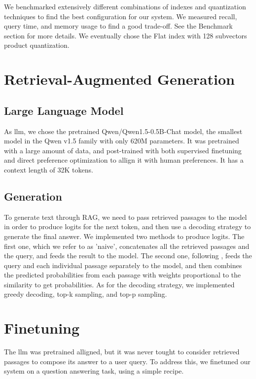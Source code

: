 \documentclass[11pt]{article}
\begin{document}
We benchmarked extensively different combinations of indexes and quantization techniques to find the best configuration
for our system. We measured recall, query time, and memory usage to find a good trade-off. See the Benchmark section for more details.
We eventually chose the Flat index with 128 subvectors product quantization.

\section{Retrieval-Augmented Generation}

\subsection{Large Language Model}

As llm, we chose the pretrained Qwen/Qwen1.5-0.5B-Chat \cite{qwen_hf} model, the smallest model in the Qwen v1.5 family
with only 620M parameters. It was pretrained with a large amount of data, and post-trained with both supervised finetuning 
and direct preference optimization to allign it with human preferences. It has a context length of 32K tokens.

\subsection{Generation}

To generate text through RAG, we need to pass retrieved passages to the model in order to produce logits
for the next token, and then use a decoding strategy to generate the final answer.
We implemented two methods to produce logits. The first one, which we refer to as 'naive', concatenates all the retrieved passages
and the query, and feeds the result to the model. The second one, following \cite{replug}, feeds the query and each individual passage
separately to the model, and then combines the predicted probabilities from each passage with weights proportional to the similarity
to get probabilities.
As for the decoding strategy, we implemented greedy decoding, top-k sampling, and top-p sampling. \cite{decoding}

\section{Finetuning}

The llm was pretrained alligned, but it was never tought to consider retrieved passages to compose its answer to a user query.
To address this, we finetuned our system on a question answering task, using a simple recipe.
\end{document}
